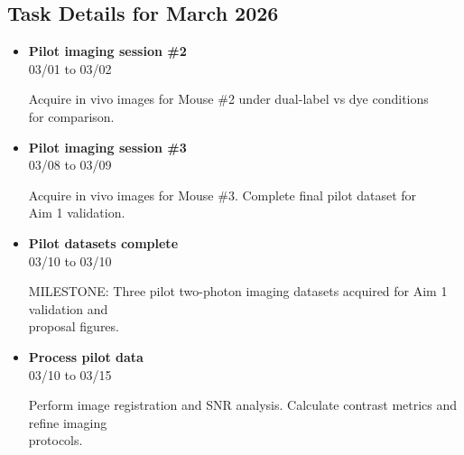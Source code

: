 \documentclass[landscape,a4paper]{article}
\begin{document}
\vspace{0.5cm}
\subsection{Task Details for March 2026}
\begin{itemize}[leftmargin=1cm, itemsep=0.8em]
    \item \textcolor{other}{\textbf{Pilot imaging session \#2}}\\[0.2em]
          \textcolor{black!70}{\small 03/01 to 03/02}
\\[0.3em]
          \begin{minipage}[t]{0.85\textwidth}
          \textcolor{black!80}{Acquire in vivo images for Mouse \#2 under dual-label vs dye conditions\\[0.1em]
          for comparison.}
          \end{minipage}

    \item \textcolor{other}{\textbf{Pilot imaging session \#3}}\\[0.2em]
          \textcolor{black!70}{\small 03/08 to 03/09}
\\[0.3em]
          \begin{minipage}[t]{0.85\textwidth}
          \textcolor{black!80}{Acquire in vivo images for Mouse \#3. Complete final pilot dataset for\\[0.1em]
          Aim 1 validation.}
          \end{minipage}

    \item \textcolor{other}{\textbf{Pilot datasets complete}}\\[0.2em]
          \textcolor{black!70}{\small 03/10 to 03/10}
\\[0.3em]
          \begin{minipage}[t]{0.85\textwidth}
          \textcolor{black!80}{MILESTONE: Three pilot two-photon imaging datasets acquired for Aim 1 validation and\\[0.1em]
          proposal figures.}
          \end{minipage}

    \item \textcolor{other}{\textbf{Process pilot data}}\\[0.2em]
          \textcolor{black!70}{\small 03/10 to 03/15}
\\[0.3em]
          \begin{minipage}[t]{0.85\textwidth}
          \textcolor{black!80}{Perform image registration and SNR analysis. Calculate contrast metrics and refine imaging\\[0.1em]
          protocols.}
          \end{minipage}


\end{itemize}
\end{document}
